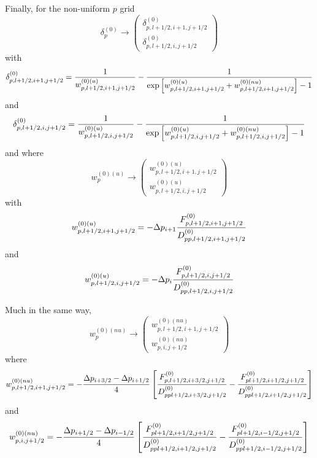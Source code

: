 Finally, for the non-uniform $p$ grid
\begin{equation}
\delta _{p}^{\left( 0\right) }\rightarrow \left(
\begin{array}{l}
\delta _{p,l+1/2,i+1,j+1/2}^{\left( 0\right) } \\
\delta _{p,l+1/2,i,j+1/2}^{\left( 0\right) }
\end{array}
\right)
\end{equation}
with
\begin{equation}
\delta _{p,l+1/2,i+1,j+1/2}^{\left( 0\right) }=\frac{1}{%
w_{p,l+1/2,i+1,j+1/2}^{\left( 0\right) (u)}}-\frac{1}{\exp \left[
w_{p,l+1/2,i+1,j+1/2}^{\left( 0\right) (u)}+w_{p,l+1/2,i+1,j+1/2}^{\left(
0\right) (nu)}\right] -1}
\end{equation}
and
\begin{equation}
\delta _{p,l+1/2,i,j+1/2}^{\left( 0\right) }=\frac{1}{w_{p,l+1/2,i,j+1/2}^{%
\left( 0\right) (u)}}-\frac{1}{\exp \left[ w_{p,l+1/2,i,j+1/2}^{\left(
0\right) (u)}+w_{p,l+1/2,i,j+1/2}^{\left( 0\right) (nu)}\right] -1}
\end{equation}
and where
\begin{equation}
w_{p}^{\left( 0\right) (u)}\rightarrow \left(
\begin{array}{l}
w_{p,l+1/2,i+1,j+1/2}^{\left( 0\right) (u)} \\
w_{p,l+1/2,i,j+1/2}^{\left( 0\right) (u)}
\end{array}
\right)
\end{equation}
with
\begin{equation}
w_{p,l+1/2,i+1,j+1/2}^{\left( 0\right) (u)}=-\Delta p_{i+1}\frac{%
F_{p,l+1/2,i+1,j+1/2}^{\left( 0\right) }}{D_{pp,l+1/2,i+1,j+1/2}^{\left(
0\right) }}
\end{equation}
and
\begin{equation}
w_{p,l+1/2,i,j+1/2}^{\left( 0\right) (u)}=-\Delta p_{i}\frac{%
F_{p,l+1/2,i,j+1/2}^{\left( 0\right) }}{D_{pp,l+1/2,i,j+1/2}^{\left(
0\right) }}
\end{equation}

Much in the same way,
\begin{equation}
w_{p}^{\left( 0\right) (nu)}\rightarrow \left(
\begin{array}{l}
w_{p,l+1/2,i+1,j+1/2}^{\left( 0\right) (nu)} \\
w_{p,i,j+1/2}^{\left( 0\right) (nu)}
\end{array}
\right)
\end{equation}
where
\begin{equation}
w_{p,l+1/2,i+1,j+1/2}^{\left( 0\right) (nu)}=-\frac{\Delta p_{i+3/2}-\Delta
p_{i+1/2}}{4}\left[ \frac{F_{p,l+1/2,i+3/2,j+1/2}^{\left( 0\right) }}{%
D_{ppl+1/2,i+3/2,j+1/2}^{\left( 0\right) }}-\frac{F_{pl+1/2,i+1/2,j+1/2}^{%
\left( 0\right) }}{D_{ppl+1/2,i+1/2,j+1/2}^{\left( 0\right) }}\right]
\end{equation}
and
\begin{equation}
w_{p,i,j+1/2}^{\left( 0\right) (nu)}=-\frac{\Delta p_{i+1/2}-\Delta p_{i-1/2}%
}{4}\left[ \frac{F_{pl+1/2,i+1/2,j+1/2}^{\left( 0\right) }}{%
D_{ppl+1/2,i+1/2,j+1/2}^{\left( 0\right) }}-\frac{F_{pl+1/2,i-1/2,j+1/2}^{%
\left( 0\right) }}{D_{ppl+1/2,i-1/2,j+1/2}^{\left( 0\right) }}\right]
\end{equation}

